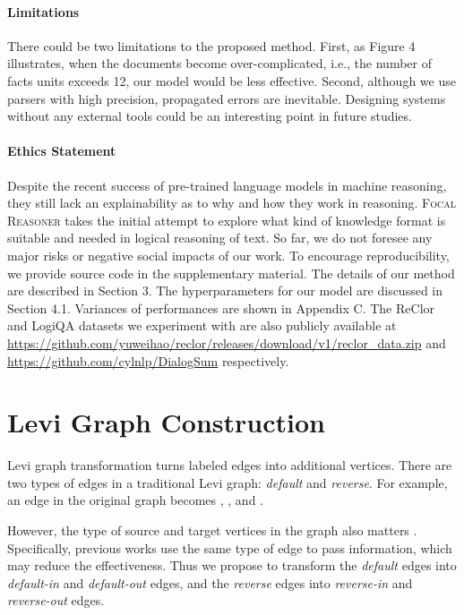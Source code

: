 \documentclass[11pt]{article}
\begin{document}
\paragraph{Limitations} There could be two limitations to the proposed method. First, as Figure 4 illustrates, when the documents become over-complicated, i.e., the number of facts units exceeds 12, our model would be less effective. Second, although we use parsers with high precision, propagated errors are inevitable. Designing systems without any external tools could be an interesting point in future studies.

\paragraph{Ethics Statement} Despite the recent success of pre-trained language models in machine reasoning, they still lack an explainability as to why and how they work in reasoning. \textsc{Focal Reasoner} takes the initial attempt to explore what kind of knowledge format is suitable and needed in logical reasoning of text. So far, we do not foresee any major risks or negative social impacts of our work. To encourage reproducibility, we provide source code in the supplementary material. The details of our method are described in Section 3. The hyperparameters for our model are discussed in Section 4.1. Variances of performances are shown in Appendix C. The ReClor and LogiQA datasets we experiment with are also publicly available at \url{https://github.com/yuweihao/reclor/releases/download/v1/reclor_data.zip} and \url{https://github.com/cylnlp/DialogSum} respectively. 




\appendix
\onecolumn
\section{Levi Graph Construction} \label{edge_type}

Levi graph transformation turns labeled edges into additional vertices. There are two types of edges in a traditional Levi graph: \textit{default} and \textit{reverse}. For example, an edge  in the original graph becomes , ,  and .

However, the type of source and target vertices in the graph also matters \citep{beck2018graph}. Specifically, previous works use the same type of edge to pass information, which may reduce the effectiveness. Thus we propose to transform the \textit{default} edges into \textit{default-in} and \textit{default-out} edges, and the \textit{reverse} edges into \textit{reverse-in} and \textit{reverse-out} edges.
\end{document}
